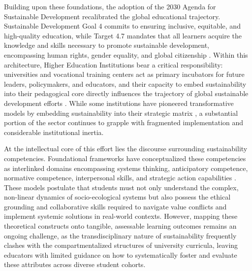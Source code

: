 \documentclass[pdflatex,sn-basic]{sn-jnl}%
\begin{document}
Building upon these foundations, the adoption of the 2030 Agenda for Sustainable Development recalibrated the global educational trajectory. Sustainable Development Goal 4 commits to ensuring inclusive, equitable, and high-quality education, while Target 4.7 mandates that all learners acquire the knowledge and skills necessary to promote sustainable development, encompassing human rights, gender equality, and global citizenship \cite{alonso_interventions_2023, joseph_policing_2025}. Within this architecture, Higher Education Institutions bear a critical responsibility: universities and vocational training centers act as primary incubators for future leaders, policymakers, and educators, and their capacity to embed sustainability into their pedagogical core directly influences the trajectory of global sustainable development efforts \cite{aver_higher_2021, ferk_savec_role_2025, demaidi_integrating_2021}. While some institutions have pioneered transformative models by embedding sustainability into their strategic matrix \cite{sahin_advancing_2025, oliveira-melo_efficiency_2025}, a substantial portion of the sector continues to grapple with fragmented implementation and considerable institutional inertia.

At the intellectual core of this effort lies the discourse surrounding sustainability competencies. Foundational frameworks have conceptualized these competencies as interlinked domains encompassing systems thinking, anticipatory competence, normative competence, interpersonal skills, and strategic action capabilities \cite{mukhtar_environmental_2019, besong_dispositions_2015, laasch_interdisciplinary_2023}. These models postulate that students must not only understand the complex, non-linear dynamics of socio-ecological systems but also possess the ethical grounding and collaborative skills required to navigate value conflicts and implement systemic solutions in real-world contexts. However, mapping these theoretical constructs onto tangible, assessable learning outcomes remains an ongoing challenge, as the transdisciplinary nature of sustainability frequently clashes with the compartmentalized structures of university curricula, leaving educators with limited guidance on how to systematically foster and evaluate these attributes across diverse student cohorts.
\end{document}
